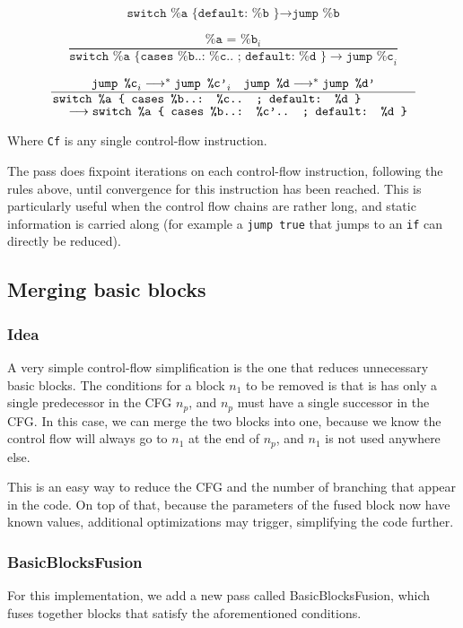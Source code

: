\documentclass[11pt,a4paper]{article}
\newcommand{\scala}[1]{\textsf{#1}}
\newcommand{\nir}[1]{\texttt{#1}}
\begin{document}
$$ \nir{switch \%a \{ default: \%b \} } \longrightarrow \nir{jump \%b} $$

$$ \frac{\nir{\%a = \%b}_i}{\nir{switch \%a \{ cases \%b..: \%c.. ; default: \%d \} } \longrightarrow \nir{jump \%c}_i} $$

$$ \frac{\nir{jump \%c}_i \longrightarrow^* \nir{jump \%c'}_i \quad \nir{jump \%d} \longrightarrow^* \nir{jump \%d'}}{\splitfrac{\nir{switch \%a \{ cases \%b..: \%c.. ; default: \%d \} }}{\longrightarrow \nir{switch \%a \{ cases \%b..: \%c'.. ; default: \%d \} }}} $$

Where \nir{Cf} is any single control-flow instruction.

The pass does fixpoint iterations on each control-flow instruction, following the rules above, until convergence for this instruction has been reached. This is particularly useful when the control flow chains are rather long, and static information is carried along (for example a \nir{jump true} that jumps to an \nir{if} can directly be reduced).

\subsection{Merging basic blocks}

\subsubsection*{Idea}

A very simple control-flow simplification is the one that reduces unnecessary basic blocks. The conditions for a block $n_1$ to be removed is that is has only a single predecessor in the CFG $n_p$, and $n_p$ must have a single successor in the CFG. In this case, we can merge the two blocks into one, because we know the control flow will always go to $n_1$ at the end of $n_p$, and $n_1$ is not used anywhere else.

This is an easy way to reduce the CFG and the number of branching that appear in the code. On top of that, because the parameters of the fused block now have known values, additional optimizations may trigger, simplifying the code further.

\subsubsection*{BasicBlocksFusion}

For this implementation, we add a new pass called \scala{BasicBlocksFusion}, which fuses together blocks that satisfy the aforementioned conditions.
\end{document}
